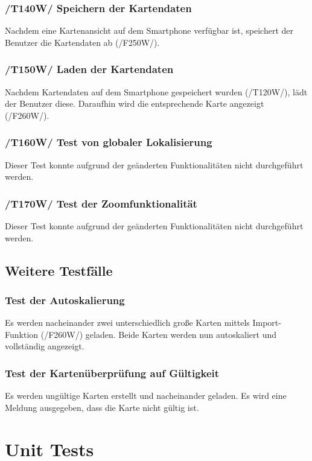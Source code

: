 \documentclass[10pt,a4paper]{article}
\begin{document}
			\subsubsection{/T140W/ Speichern der Kartendaten}
			Nachdem eine Kartenansicht auf dem Smartphone verfügbar ist, speichert der Benutzer die Kartendaten ab (/F250W/).
			
			\subsubsection{/T150W/ Laden der Kartendaten}
			Nachdem Kartendaten auf dem Smartphone gespeichert wurden (/T120W/), lädt der Benutzer diese.
			Daraufhin wird die entsprechende Karte angezeigt (/F260W/).
			
			\subsubsection{/T160W/ Test von globaler Lokalisierung}
			Dieser Test konnte aufgrund der ge\"anderten Funktionalit\"aten nicht durchgef\"uhrt werden.
			
			\subsubsection{/T170W/ Test der Zoomfunktionalit\"at}
			Dieser Test konnte aufgrund der ge\"anderten Funktionalit\"aten nicht durchgef\"uhrt werden.
		
		\subsection{Weitere Testfälle}
					\subsubsection{Test der Autoskalierung}
					Es werden nacheinander zwei unterschiedlich gro\ss e Karten mittels Import-Funktion (/F260W/) geladen. Beide Karten
					werden nun autoskaliert und vollst\"andig angezeigt.
					\subsubsection{Test der Karten\"uberpr\"ufung auf G\"ultigkeit}
					Es werden ung\"ultige Karten erstellt und nacheinander geladen. Es wird eine Meldung ausgegeben, dass die Karte nicht g\"ultig ist.
	
	\section{Unit Tests}
\end{document}
